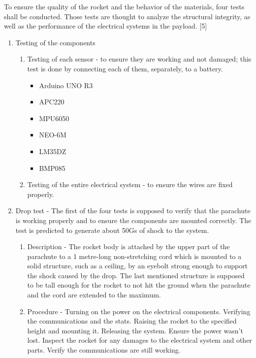 To ensure the quality of the rocket and the behavior of the materials, four tests shall be conducted. Those tests are thought to analyze the structural integrity, as well as the performance of the electrical systems in the payload. [5]

\begin{enumerate}

\item Testing of the components
    \begin{enumerate}
        \item Testing of each sensor - to ensure they are working and not damaged; this test is done by connecting each of them, separately, to a battery.
            \begin{itemize}
                \item Arduino UNO R3
                \item APC220
                \item MPU6050
                \item NEO-6M
                \item LM35DZ
                \item BMP085
            \end{itemize}
        \item Testing of the entire electrical system - to ensure the wires are fixed properly.
    \end{enumerate}
\item Drop test
    - The first of the four tests is supposed to verify that the parachute is working properly and to ensure the components are mounted correctly. The test is predicted to generate about 50Gs of shock to the system.
    \begin{enumerate}
        \item Description - The rocket body is attached by the upper part of the parachute to a 1 metre-long non-stretching cord which is mounted to a solid structure, such as a ceiling, by an eyebolt strong enough to support the shock caused by the drop. The last mentioned structure is supposed to be tall enough for the rocket to not hit the ground when the parachute and the cord are extended to the maximum.
        \item Procedure - Turning on the power on the electrical components. Verifying the communications and the stats. Raising the rocket to the specified height and mounting it. Releasing the system. Ensure the power wasn't lost. Inspect the rocket for any damages to the electrical system and other parts. Verify the communications are still working.

\end{enumerate}
\end{enumerate}
